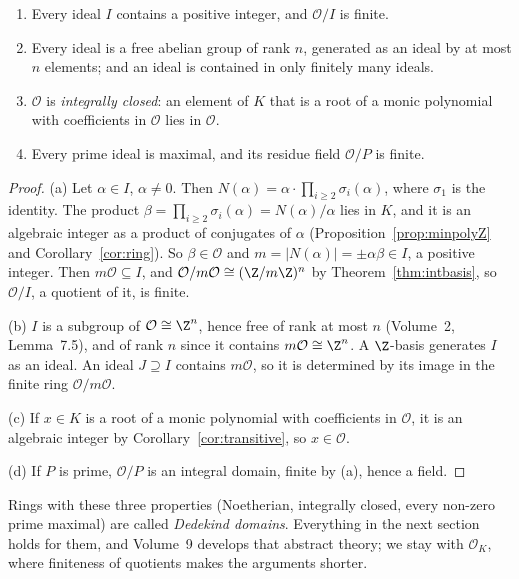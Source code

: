 \begin{proposition}\label{prop:noeth}
\begin{enumerate}[label=(\alph*)]
\item Every ideal $I$ contains a positive integer, and $\mathcal O/I$ is finite.
\item Every ideal is a free abelian group of rank $n$, generated as an ideal by at most $n$ elements; and an ideal is
contained in only finitely many ideals.
\item $\mathcal O$ is \emph{integrally closed}: an element of $K$ that is a root of a monic polynomial with coefficients in
$\mathcal O$ lies in $\mathcal O$.
\item Every prime ideal is maximal, and its residue field $\mathcal O/P$ is finite.
\end{enumerate}
\end{proposition}
\begin{proof}
(a) Let $\alpha\in I$, $\alpha\ne0$. Then $N(\alpha)=\alpha\cdot\prod_{i\ge2}\sigma_i(\alpha)$, where $\sigma_1$ is the
identity. The product $\beta=\prod_{i\ge2}\sigma_i(\alpha)=N(\alpha)/\alpha$ lies in $K$, and it is an algebraic integer
as a product of conjugates of $\alpha$ (Proposition~\ref{prop:minpolyZ} and Corollary~\ref{cor:ring}). So $\beta\in\mathcal
O$ and $m=|N(\alpha)|=\pm\alpha\beta\in I$, a positive integer. Then $m\mathcal O\subseteq I$, and $\mathcal O/m\mathcal
O\cong(\Z/m\Z)^n$ by Theorem~\ref{thm:intbasis}, so $\mathcal O/I$, a quotient of it, is finite.

(b) $I$ is a subgroup of $\mathcal O\cong\Z^n$, hence free of rank at most $n$ (Volume~2, Lemma~7.5), and of rank $n$
since it contains $m\mathcal O\cong\Z^n$. A $\Z$-basis generates $I$ as an ideal. An ideal $J\supseteq I$ contains
$m\mathcal O$, so it is determined by its image in the finite ring $\mathcal O/m\mathcal O$.

(c) If $x\in K$ is a root of a monic polynomial with coefficients in $\mathcal O$, it is an algebraic integer by
Corollary~\ref{cor:transitive}, so $x\in\mathcal O$.

(d) If $P$ is prime, $\mathcal O/P$ is an integral domain, finite by (a), hence a field.
\end{proof}

Rings with these three properties (Noetherian, integrally closed, every non-zero prime maximal) are called
\emph{Dedekind domains}. Everything in the next section holds for them, and Volume~9 develops that abstract theory; we
stay with $\mathcal O_K$, where finiteness of quotients makes the arguments shorter.

